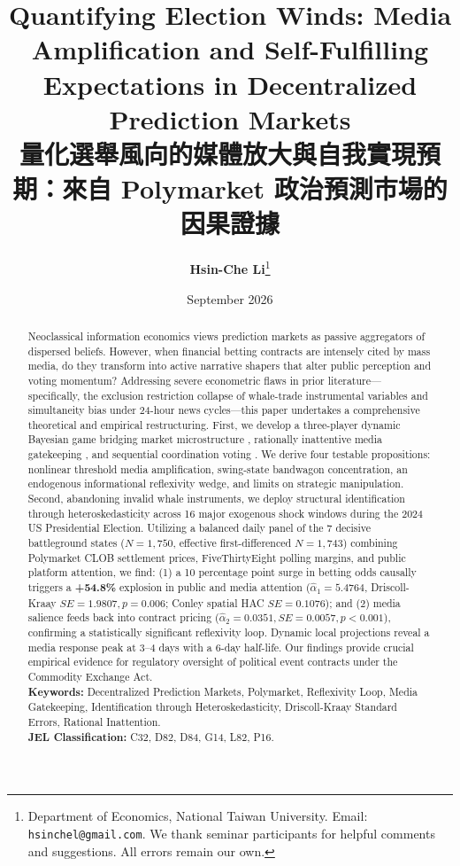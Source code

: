 \documentclass[12pt, a4paper]{article}
\title{\textbf{\LARGE Quantifying Election Winds: Media Amplification and Self-Fulfilling Expectations in Decentralized Prediction Markets}\\[0.4cm]
\Large 量化選舉風向的媒體放大與自我實現預期：來自 Polymarket 政治預測市場的因果證據}
\author{\textbf{Hsin-Che Li}\thanks{Department of Economics, National Taiwan University. Email: \texttt{hsinchel@gmail.com}. We thank seminar participants for helpful comments and suggestions. All errors remain our own.}}
\date{September 2026}
\begin{document}
\maketitle

\begin{abstract}
\noindent
Neoclassical information economics views prediction markets as passive aggregators of dispersed beliefs. However, when financial betting contracts are intensely cited by mass media, do they transform into active narrative shapers that alter public perception and voting momentum? Addressing severe econometric flaws in prior literature---specifically, the exclusion restriction collapse of whale-trade instrumental variables and simultaneity bias under 24-hour news cycles---this paper undertakes a comprehensive theoretical and empirical restructuring. First, we develop a three-player dynamic Bayesian game bridging market microstructure \citep{Kyle1985, GlostenMilgrom1985}, rationally inattentive media gatekeeping \citep{Sims2003, Bordalo2013}, and sequential coordination voting \citep{Callander2007}. We derive four testable propositions: nonlinear threshold media amplification, swing-state bandwagon concentration, an endogenous informational reflexivity wedge, and limits on strategic manipulation. Second, abandoning invalid whale instruments, we deploy \citet{Rigobon2003} structural identification through heteroskedasticity across 16 major exogenous shock windows during the 2024 US Presidential Election. Utilizing a balanced daily panel of the 7 decisive battleground states ($N = 1,750$, effective first-differenced $N = 1,743$) combining Polymarket CLOB settlement prices, FiveThirtyEight polling margins, and public platform attention, we find: (1) a 10 percentage point surge in betting odds causally triggers a \textbf{+54.8\%} explosion in public and media attention ($\hat{\alpha}_1 = 5.4764$, Driscoll-Kraay $SE = 1.9807, p = 0.006$; Conley spatial HAC $SE = 0.1076$); and (2) media salience feeds back into contract pricing ($\hat{\alpha}_2 = 0.0351, SE = 0.0057, p < 0.001$), confirming a statistically significant reflexivity loop. Dynamic local projections reveal a media response peak at 3--4 days with a 6-day half-life. Our findings provide crucial empirical evidence for regulatory oversight of political event contracts under the Commodity Exchange Act.
\\[0.3cm]
\noindent \textbf{Keywords:} Decentralized Prediction Markets, Polymarket, Reflexivity Loop, Media Gatekeeping, Identification through Heteroskedasticity, Driscoll-Kraay Standard Errors, Rational Inattention. \\
\noindent \textbf{JEL Classification:} C32, D82, D84, G14, L82, P16.
\end{abstract}
\end{document}
